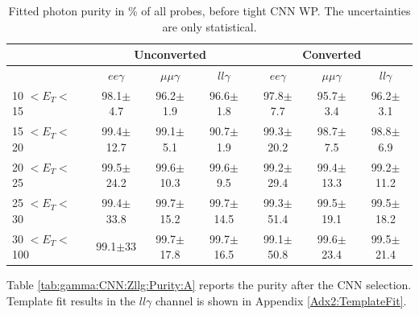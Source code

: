 \begin{table}[htbp]
\centering
\begin{tabular}{lcccccc}
\hline\hline
                             & \multicolumn{3}{c}{Unconverted}               & \multicolumn{3}{c}{Converted}                \\
                            \hline
                             & $ee\gamma$           & $\mu\mu\gamma$           & $ll\gamma$           & $ee\gamma$           &  $\mu\mu\gamma$          & $ll\gamma$           \\
    \hline
10 $ < E_T < $ 15 & 98.1$\pm$4.7   &   96.2$\pm$1.9   &   96.6$\pm$1.8   &   97.8$\pm$7.7   &   95.7$\pm$3.4    &   96.2$\pm$3.1  \\
15 $ < E_T < $ 20 & 99.4$\pm$12.7  &   99.1$\pm$5.1   &   90.7$\pm$1.9   &   99.3$\pm$20.2  &   98.7$\pm$7.5    &   98.8$\pm$6.9  \\
20 $ < E_T < $ 25 & 99.5$\pm$24.2  &   99.6$\pm$10.3  &   99.6$\pm$9.5   &   99.2$\pm$29.4  &   99.4$\pm$13.3   &   99.2$\pm$11.2 \\
25 $ < E_T < $ 30 & 99.4$\pm$33.8  &   99.7$\pm$15.2  &   99.7$\pm$14.5  &   99.3$\pm$51.4  &   99.5$\pm$19.1   &   99.5$\pm$18.2    \\
30 $ < E_T < $ 100 & 99.1$\pm$33   &   99.7$\pm$17.8  &   99.7$\pm$16.5  &   99.1$\pm$50.8  &   99.6$\pm$23.4   &   99.5$\pm$21.4 \\
\hline\hline
\end{tabular}
\begin{tcolorbox}[colback=black!5!white,colframe=white!75!black]
\caption{Fitted photon purity in \% of all probes, before tight CNN WP. The uncertainties are only statistical.}
\label{tab:gamma:CNN:Zllg:Purity:B}
\end{tcolorbox}
\end{table}
\clearpage
Table \ref{tab:gamma:CNN:Zllg:Purity:A} reports the purity after the CNN selection. Template fit results in the $ll\gamma$ channel is shown in Appendix \ref{Adx2:TemplateFit}.
